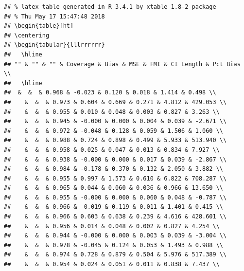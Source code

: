 \documentclass{svjour3}\usepackage[]{graphicx}\usepackage[]{color}
\makeatletter
\newenvironment{kframe}{%
 \def\at@end@of@kframe{}%
 \ifinner\ifhmode%
  \def\at@end@of@kframe{\end{minipage}}%
  \begin{minipage}{\columnwidth}%
 \fi\fi%
 \def\FrameCommand##1{\hskip\@totalleftmargin \hskip-\fboxsep
 \colorbox{shadecolor}{##1}\hskip-\fboxsep
     \hskip-\linewidth \hskip-\@totalleftmargin \hskip\columnwidth}%
 \MakeFramed {\advance\hsize-\width
   \@totalleftmargin\z@ \linewidth\hsize
   \@setminipage}}%
 {\par\unskip\endMakeFramed%
 \at@end@of@kframe}
\newenvironment{knitrout}{}{} %
\makeatother
\begin{document}
\begin{knitrout}
\begin{kframe}

{\ttfamily\noindent\bfseries{}}\begin{verbatim}
## % latex table generated in R 3.4.1 by xtable 1.8-2 package
## % Thu May 17 15:47:48 2018
## \begin{table}[ht]
## \centering
## \begin{tabular}{lllrrrrrr}
##   \hline
## "" & "" & "" & Coverage & Bias & MSE & FMI & CI Length & Pct Bias \\ 
##   \hline
##  &  &  & 0.968 & -0.023 & 0.120 & 0.018 & 1.414 & 0.498 \\ 
##    &  &  & 0.973 & 0.604 & 0.669 & 0.271 & 4.812 & 429.053 \\ 
##    &  &  & 0.955 & 0.010 & 0.048 & 0.003 & 0.827 & 3.263 \\ 
##    &  &  & 0.945 & -0.000 & 0.000 & 0.004 & 0.039 & -2.671 \\ 
##    &  &  & 0.972 & -0.048 & 0.128 & 0.059 & 1.506 & 1.060 \\ 
##    &  &  & 0.988 & 0.724 & 0.898 & 0.499 & 5.933 & 513.940 \\ 
##    &  &  & 0.958 & 0.025 & 0.047 & 0.013 & 0.834 & 7.927 \\ 
##    &  &  & 0.938 & -0.000 & 0.000 & 0.017 & 0.039 & -2.867 \\ 
##    &  &  & 0.984 & -0.178 & 0.370 & 0.132 & 2.050 & 3.882 \\ 
##    &  &  & 0.955 & 0.997 & 1.573 & 0.610 & 6.822 & 708.287 \\ 
##    &  &  & 0.965 & 0.044 & 0.060 & 0.036 & 0.966 & 13.650 \\ 
##    &  &  & 0.955 & -0.000 & 0.000 & 0.060 & 0.048 & -0.787 \\ 
##    &  &  & 0.966 & -0.019 & 0.119 & 0.011 & 1.401 & 0.415 \\ 
##    &  &  & 0.966 & 0.603 & 0.638 & 0.239 & 4.616 & 428.601 \\ 
##    &  &  & 0.956 & 0.014 & 0.048 & 0.002 & 0.827 & 4.254 \\ 
##    &  &  & 0.944 & -0.000 & 0.000 & 0.003 & 0.039 & -3.004 \\ 
##    &  &  & 0.978 & -0.045 & 0.124 & 0.053 & 1.493 & 0.988 \\ 
##    &  &  & 0.974 & 0.728 & 0.879 & 0.504 & 5.976 & 517.389 \\ 
##    &  &  & 0.954 & 0.024 & 0.051 & 0.011 & 0.838 & 7.437 \\ 

\end{verbatim}
\end{kframe}
\end{knitrout}
\end{document}
